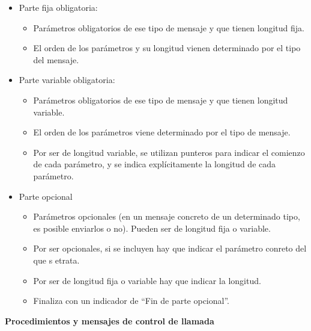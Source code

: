 \documentclass[10pt,portrait, twocolumn]{article}
\begin{document}
	\begin{itemize}
	\item Parte fija obligatoria:
		\begin{itemize}
		\item Parámetros obligatorios de ese tipo de mensaje y que tienen longitud fija.
		\item El orden de los parámetros y su longitud vienen determinado por el tipo del mensaje.
		\end{itemize}
	\item Parte variable obligatoria:
		\begin{itemize}
		\item Parámetros obligatorios de ese tipo de mensaje y que tienen longitud variable.
		\item El orden de los parámetros viene determinado por el tipo de mensaje.
		\item Por ser de longitud variable, se utilizan punteros para indicar el comienzo de cada parámetro, y se indica explícitamente la longitud de cada parámetro.
		\end{itemize}
	\item Parte opcional
		\begin{itemize}
		\item Parámetros opcionales (en un mensaje concreto de un determinado tipo, es posible enviarlos o no). Pueden ser de longitud fija o variable.
		\item Por ser opcionales, si se incluyen hay que indicar el parámetro conreto del que s etrata.
		\item Por ser de longitud fija o variable hay que indicar la longitud.
		\item Finaliza con un indicador de ``Fin de parte opcional''.
		\end{itemize}
	\end{itemize}
	
\textbf{Procedimientos y mensajes de control de llamada}	
	
\end{document}
